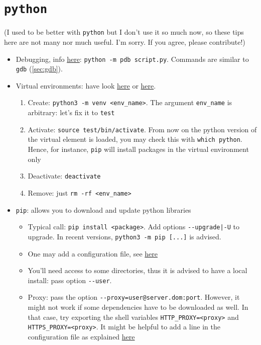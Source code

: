 \documentclass[a4paper,12pt,%
              final%
              ]{article}
\begin{document}
\section{\texttt{python}}
\label{sec:python}
(I used to be better with \texttt{python} but I don't use it so much now, so these tips here are not many nor much useful. I'm sorry. If you agree, please contribute!)
\begin{itemize}
  \item Debugging, info \href{https://docs.python.org/2/library/pdb.html}{here}: \texttt{python -m pdb script.py}. Commands are similar to \texttt{gdb} (\ref{sec:gdb}).
  \item Virtual environments: have look \href{https://packaging.python.org/guides/installing-using-pip-and-virtual-environments/}{here} or \href{https://docs.python.org/3/tutorial/venv.html}{here}.
    \begin{enumerate}
      \item Create: \verb|python3 -m venv <env_name>|. The argument \verb|env_name| is arbitrary: let's fix it to \verb|test|
      \item Activate: \verb|source test/bin/activate|. From now on the python version of the virtual element is loaded, you may check this with \verb|which python|. Hence, for instance, \verb|pip| will install packages in the virtual environment only
      \item Deactivate: \verb|deactivate|
      \item Remove: just \verb|rm -rf <env_name>|
    \end{enumerate}
  \item \texttt{pip}: allows you to download and update python libraries
    \begin{itemize}
      \item Typical call: \verb|pip install <package>|. Add options \verb!--upgrade|-U! to upgrade. In recent versions, \verb|python3 -m pip [...]| is advised.
      \item One may add a configuration file, see \href{https://pip.pypa.io/en/stable/topics/configuration/}{here}
      \item You'll need access to some directories, thus it is advised to have a local install: pass option \verb|--user|.
      \item Proxy: pass the option \verb|--proxy=user@server.dom:port|. However, it might not work if some dependencies have to be downloaded as well. In that case, try exporting the shell variables \verb|HTTP_PROXY=<proxy>| and \verb|HTTPS_PROXY=<proxy>|. It might be helpful to add a line in the configuration file as explained \href{https://stackoverflow.com/questions/43473041/how-to-configure-pip-per-config-file-to-use-a-proxy-with-authentification}{here}

\end{itemize}
\end{itemize}
\end{document}
